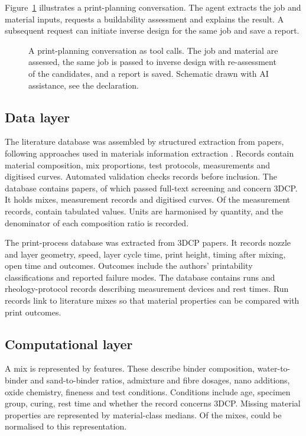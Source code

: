 \documentclass[preprint,12pt]{elsarticle}
\newcommand{\aidisclosure}{Schematic drawn with AI assistance, see the declaration.}
\begin{document}
Figure~\ref{fig:seq} illustrates a print-planning conversation. The agent extracts the job and material inputs, requests a buildability assessment and explains the result. A subsequent request can initiate inverse design for the same job and save a report.

\begin{figure}[t]
\centering
\resizebox{\textwidth}{!}{}
\caption{A print-planning conversation as tool calls. The job and material are assessed, the same job is passed to inverse design with re-assessment of the candidates, and a report is saved. \aidisclosure}
\label{fig:seq}
\end{figure}

\subsection{Data layer}

The literature database was assembled by structured extraction from papers, following approaches used in materials information extraction \cite{dagdelen2024structured,polak2024extracting}. Records contain material composition, mix proportions, test protocols, measurements and digitised curves. Automated validation checks records before inclusion. The database contains \npapers{} papers, of which \npapersIncluded{} passed full-text screening and \npapersThreeDCP{} concern 3DCP. It holds \nmixes{} mixes, \nmeasurements{} measurement records and \ncurves{} digitised curves. Of the measurement records, \nmeasurementsValued{} contain tabulated values. Units are harmonised by quantity, and the denominator of each composition ratio is recorded.

The print-process database was extracted from \nprintPapers{} 3DCP papers. It records nozzle and layer geometry, speed, layer cycle time, print height, timing after mixing, open time and outcomes. Outcomes include the authors' printability classifications and reported failure modes. The database contains \nprintRuns{} runs and \nprotocolRows{} rheology-protocol records describing measurement devices and rest times. Run records link to literature mixes so that material properties can be compared with print outcomes.

\subsection{Computational layer}

A mix is represented by \nnFeatures{} features. These describe binder composition, water-to-binder and sand-to-binder ratios, admixture and fibre dosages, nano additions, oxide chemistry, fineness and test conditions. Conditions include age, specimen group, curing, rest time and whether the record concerns 3DCP. Missing material properties are represented by material-class medians. Of the \nmixes{} mixes, \nnMixesNorm{} could be normalised to this representation.
\end{document}
